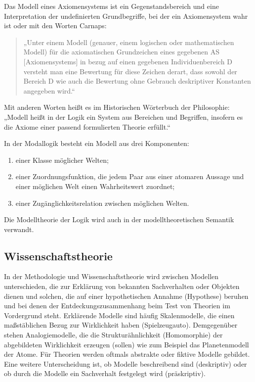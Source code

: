 \documentclass[a4paper, 12pt]{scrartcl}
\begin{document}
Das Modell eines Axiomensystems ist ein Gegenstandsbereich und eine Interpretation der undefinierten Grundbegriffe, bei der ein Axiomensystem wahr ist oder mit den Worten Carnaps:

\begin{quote}
    „Unter einem Modell (genauer, einem logischen oder mathematischen Modell) für die axiomatischen Grundzeichen eines gegebenen AS [Axiomensystems] in bezug auf einen gegebenen Individuenbereich D versteht man eine Bewertung für diese Zeichen derart, dass sowohl der Bereich D wie auch die Bewertung ohne Gebrauch deskriptiver Konstanten angegeben wird.“
\end{quote}

Mit anderen Worten heißt es im Historischen Wörterbuch der Philosophie: „Modell heißt in der Logik ein System aus Bereichen und Begriffen, insofern es die Axiome einer passend formulierten Theorie erfüllt.“

In der Modallogik besteht ein Modell aus drei Komponenten:

\begin{enumerate}
    \item einer Klasse möglicher Welten;
    \item einer Zuordnungsfunktion, die jedem Paar aus einer atomaren Aussage und einer möglichen Welt einen Wahrheitswert zuordnet;
    \item einer Zugänglichkeitsrelation zwischen möglichen Welten.
\end{enumerate}

Die Modelltheorie der Logik wird auch in der modelltheoretischen Semantik verwandt.

\subsection{Wissenschaftstheorie}
In der Methodologie und Wissenschaftstheorie wird zwischen Modellen unterschieden, die zur Erklärung von bekannten Sachverhalten oder Objekten dienen und solchen, die auf einer hypothetischen Annahme (Hypothese) beruhen und bei denen der Entdeckungszusammenhang beim Test von Theorien im Vordergrund steht. Erklärende Modelle sind häufig Skalenmodelle, die einen maßstäblichen Bezug zur Wirklichkeit haben (Spielzeugauto). Demgegenüber stehen Analogiemodelle, die die Strukturähnlichkeit (Homomorphie) der abgebildeten Wirklichkeit erzeugen (sollen) wie zum Beispiel das Planetenmodell der Atome. Für Theorien werden oftmals abstrakte oder fiktive Modelle gebildet. Eine weitere Unterscheidung ist, ob Modelle beschreibend sind (deskriptiv) oder ob durch die Modelle ein Sachverhalt festgelegt wird (präskriptiv).
\end{document}
